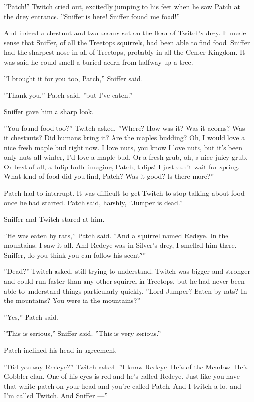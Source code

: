 \documentclass[12pt]{book}
\begin{document}
''Patch!'' Twitch cried out, excitedly jumping to his feet when he saw
Patch at the drey entrance. ''Sniffer is here! Sniffer found me
food!''

And indeed a chestnut and two acorns sat on the floor of Twitch's
drey. It made sense that Sniffer, of all the Treetops squirrels, had
been able to find food. Sniffer had the sharpest nose in all of
Treetops, probably in all the Center Kingdom. It was said he could
smell a buried acorn from halfway up a tree.

''I brought it for you too, Patch,'' Sniffer said.

''Thank you,'' Patch said, ''but I've eaten.''

Sniffer gave him a sharp look.

''You found food too?'' Twitch asked. ''Where? How was it? Was it
acorns? Was it chestnuts? Did humans bring it? Are the maples budding?
Oh, I would love a nice fresh maple bud right now. I love nuts, you
know I love nuts, but it's been only nuts all winter, I'd love a maple
bud. Or a fresh grub, oh, a nice juicy grub. Or best of all, a tulip
bulb, imagine, Patch, tulips! I just can't wait for spring. What kind
of food did you find, Patch? Was it good? Is there more?''

Patch had to interrupt. It was difficult to get Twitch to stop talking
about food once he had started. Patch said, harshly, ''Jumper is
dead.''

Sniffer and Twitch stared at him.

''He was eaten by rats,'' Patch said. ''And a squirrel named
Redeye. In the mountains. I saw it all. And Redeye was in Silver's
drey, I smelled him there. Sniffer, do you think you can follow his
scent?''

''Dead?'' Twitch asked, still trying to understand. Twitch was bigger
and stronger and could run faster than any other squirrel in Treetops,
but he had never been able to understand things particularly
quickly. ''Lord Jumper? Eaten by rats? In the mountains? You were in
the mountains?''

''Yes,'' Patch said.

''This is serious,'' Sniffer said. ''This is very serious.''

Patch inclined his head in agreement.

''Did you say Redeye?'' Twitch asked. ''I know Redeye. He's of the
Meadow. He's Gobbler clan. One of his eyes is red and he's called
Redeye. Just like you have that white patch on your head and you're
called Patch. And I twitch a lot and I'm called Twitch. And Sniffer
---''
\end{document}
